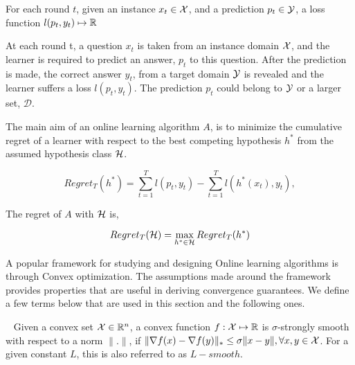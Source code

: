 \begin{definition}
	\label{def:olearning} For each round $t$, given an instance $x_t \in \mathcal{X}$, and
	a prediction $p_t \in \mathcal{Y}$, a loss function $l(p_t, y_t) \mapsto \mathbb{R}$
\end{definition}

At each round t, a question $x_t$ is taken from an instance domain $\mathcal{X}$, and
the learner is required to predict an answer, $p_t$ to this question.
After the prediction is made, the correct answer $y_t$, from a target domain $\mathcal{Y}$ is revealed
and the learner suffers a loss $l(p_t, y_t)$.
The prediction $p_t$ could belong to $\mathcal{Y}$ or a larger set, $\mathcal{D}$.


The main aim of an online learning algorithm $A$, is to minimize the cumulative regret of a learner
with respect to the best competing hypothesis $h^*$ from the assumed hypothesis class $\mathcal{H}$.

\begin{equation}
	\label{eqn:regret}
	Regret_T(h^*) = \sum_{t=1}^T l(p_t, y_t) - \sum_{t=1}^T l(h^*(x_t), y_t),
\end{equation}

The regret of $A$ with $\mathcal{H}$ is,

\begin{equation}
	\label{eqn:regret_all} Regret_T(\mathcal{H}) = \max_{h^* \in \mathcal{H}} Regret_T(h^*)
\end{equation}

A popular framework for studying and designing Online learning algorithms is
through Convex optimization.
The assumptions made around the framework provides properties that are useful in deriving
convergence guarantees.
We define a few terms below that are used in this section and the following ones.


\begin{definition}~\label{def:strsmooth}
	Given a convex set $\mathcal{X} \in \mathbb{R}^n$, a convex function $f: \mathcal{X} \mapsto \mathbb{R}$ is $\sigma$-strongly
	smooth with respect to a norm $\|.
		\|$, if $\|\nabla f(x) - \nabla f(y) \|_{\ast} \leq \sigma \|x - y \|, \forall x, y \in \mathcal{X}$.
	For a given constant $L$, this is also referred to as $L-smooth$.
\end{definition}

